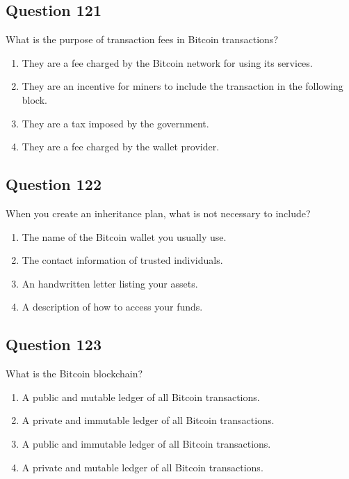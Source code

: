 \documentclass[12pt,a4paper]{article}
\begin{document}
\bigskip


\subsection*{Question 121}
What is the purpose of transaction fees in Bitcoin transactions?

\begin{enumerate}[label=\Alph*., leftmargin=*]
\item They are a fee charged by the Bitcoin network for using its services.
\item They are an incentive for miners to include the transaction in the following block.
\item They are a tax imposed by the government.
\item They are a fee charged by the wallet provider.
\end{enumerate}

\bigskip


\subsection*{Question 122}
When you create an inheritance plan, what is not necessary to include?

\begin{enumerate}[label=\Alph*., leftmargin=*]
\item The name of the Bitcoin wallet you usually use.
\item The contact information of trusted individuals.
\item An handwritten letter listing your assets.
\item A description of how to access your funds.
\end{enumerate}

\bigskip


\subsection*{Question 123}
What is the Bitcoin blockchain?

\begin{enumerate}[label=\Alph*., leftmargin=*]
\item A public and mutable ledger of all Bitcoin transactions.
\item A private and immutable ledger of all Bitcoin transactions.
\item A public and immutable ledger of all Bitcoin transactions.
\item A private and mutable ledger of all Bitcoin transactions.
\end{enumerate}
\end{document}
